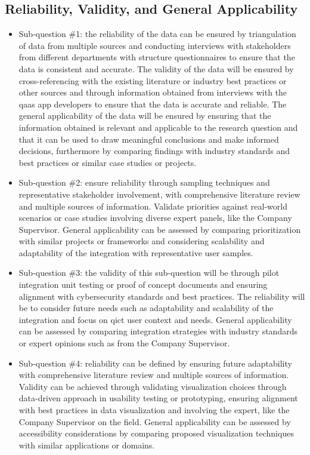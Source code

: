 \subsection{Reliability, Validity, and General Applicability}
\begin{itemize}[label=-]
      \item Sub-question \#1: the reliability of the data can be ensured by triangulation of data from
            multiple sources and conducting interviews with stakeholders from different departments with
            structure questionnaires to ensure that the data is consistent and accurate. The validity of
            the data will be ensured by  cross-referencing with the existing literature or industry best
            practices or other sources and  through information obtained from  interviews with the
            \acrshort{qaas} app developers to ensure  that the data is accurate and reliable. The general
            applicability of the data will be ensured by  ensuring that the information obtained is relevant
            and applicable to the research question and  that it can be used to draw meaningful conclusions
            and make informed decisions, furthermore by comparing findings with industry standards and best
            practices or similar case studies or projects.
      \item Sub-question \#2: ensure reliability through sampling techniques and representative stakeholder
            involvement, with comprehensive literature review and multiple sources of information. Validate
            priorities against real-world scenarios or case studies involving diverse expert panels, like
            the Company Supervisor. General applicability can be assessed by comparing prioritization with
            similar projects or frameworks and considering scalability and adaptability of the integration
            with representative user samples.
      \item Sub-question \#3: the validity of this sub-question will be through pilot integration unit testing
            or proof of concept documents and ensuring alignment with cybersecurity standards and best
            practices. The reliability will be to consider future needs such as adaptability and scalability of
            the integration and focus on \acrshort{qict} user context and needs. General applicability can be
            assessed by comparing integration strategies with industry standards or expert opinions such as from
            the Company Supervisor.
      \item Sub-question \#4: reliability can be defined by ensuring future adaptability with comprehensive
            literature review and multiple sources of information. Validity can be achieved through validating
            visualization choices through data-driven approach in usability testing or  prototyping, ensuring
            alignment with best practices in data visualization and involving the expert, like the Company
            Supervisor on the field. General applicability can be assessed by accessibility considerations by
            comparing proposed visualization techniques with similar applications or domains.
\end{itemize}

